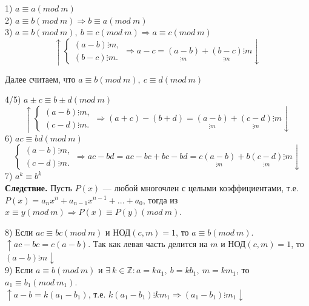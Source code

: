 \documentclass{article}
\begin{document}
            1) \( a \equiv a (mod\ m) \)\\
            2) \( a \equiv b (mod\ m) \Rightarrow b \equiv a (mod\ m) \)\\
            3) \( a \equiv b (mod\ m),\ b \equiv c (mod\ m) \Rightarrow a \equiv c (mod\ m) \)
            \[ \uparrow
                \begin{cases}
                    (a - b) \vdots m,\\
                    (b - c) \vdots m.
                \end{cases} \Rightarrow a - c = \underset{\vdots m}{(a - b)} + \underset{\vdots m}{(b - c)} \vdots m \downarrow \]
            \centerline{Далее считаем, что \( a \equiv b (mod\ m),\ c \equiv d (mod\ m) \)}
            4/5) \( a \pm c \equiv b \pm d (mod\ m) \)
            \[ \uparrow
                \begin{cases}
                    (a - b) \vdots m,\\
                    (c - d) \vdots m.
                \end{cases}
            \Rightarrow (a + c) - (b + d) = \underset{\vdots m}{(a - b)} + \underset{\vdots m}{(c - d)} \vdots m \downarrow \]
            6) \( ac \equiv bd (mod\ m) \) 
            \[ 
                \begin{cases}
                    (a - b) \vdots m,\\
                    (c - d) \vdots m.
                \end{cases}
            \Rightarrow ac - bd = ac - bc + bc - bd = c\underset{\vdots m}{(a - b)} + b\underset{\vdots m}{(c - d)} \vdots m \downarrow \]
            7) \( a^k \equiv b^k \)\\
            \textbf{Следствие.} Пусть \(P(x)\) --- любой многочлен с целыми коэффициентами, т.е. \(P(x) = a_nx^n + a_{n - 1}x^{n - 1} + ... + a_0\), тогда из \(x \equiv y (mod\ m) \Rightarrow P(x) \equiv P(y) (mod\ m)\).

            8) Если \(ac \equiv bc (mod\ m)\) и \(\textrm{НОД}(c,m) = 1\), то \(a \equiv b (mod\ m)\).\\
            \(\uparrow ac - bc = c(a - b)\). Так как левая часть делится на \(m\) и \(\textrm{НОД}(c,m) = 1\), то \((a - b) \vdots m \downarrow \)\\
            9) Если \(a \equiv b (mod\ m)\) и \(\exists\ k \in \mathbb{Z}: a = ka_1,\ b = kb_1,\ m = km_1\), то \(a_1 \equiv b_1 (mod\ m_1)\).\\
            \( \uparrow a - b = k(a_1 - b_1) \), т.е. \( k(a_1 - b_1) \vdots km_1 \Rightarrow (a_1 - b_1) \vdots m_1 \downarrow \)
\end{document}
